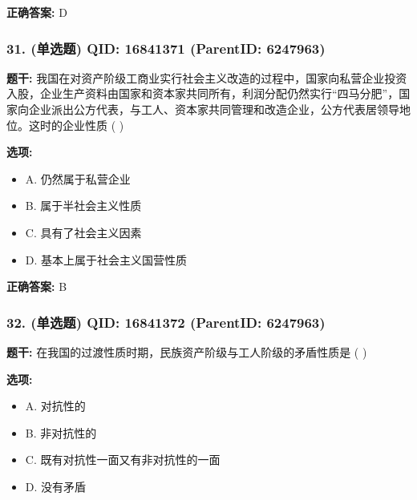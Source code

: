 \documentclass[12pt,UTF8]{ctexart}
\begin{document}
\textbf{正确答案:}
D

\vspace{0.3em}\hrulefill\vspace{0.7em}

\subsubsection*{31. (单选题) \small QID: 16841371 (ParentID: 6247963)}

\textbf{题干:}
我国在对资产阶级工商业实行社会主义改造的过程中，国家向私营企业投资入股，企业生产资料由国家和资本家共同所有，利润分配仍然实行“四马分肥”，国家向企业派出公方代表，与工人、资本家共同管理和改造企业，公方代表居领导地位。这时的企业性质 ( )



\textbf{选项:}
\begin{itemize}[leftmargin=*]

  \item A. 仍然属于私营企业

  \item B. 属于半社会主义性质

  \item C. 具有了社会主义因素

  \item D. 基本上属于社会主义国营性质

\end{itemize}

\textbf{正确答案:}
B

\vspace{0.3em}\hrulefill\vspace{0.7em}

\subsubsection*{32. (单选题) \small QID: 16841372 (ParentID: 6247963)}

\textbf{题干:}
在我国的过渡性质时期，民族资产阶级与工人阶级的矛盾性质是 ( )



\textbf{选项:}
\begin{itemize}[leftmargin=*]

  \item A. 对抗性的

  \item B. 非对抗性的

  \item C. 既有对抗性一面又有非对抗性的一面

  \item D. 没有矛盾

\end{itemize}
\end{document}
